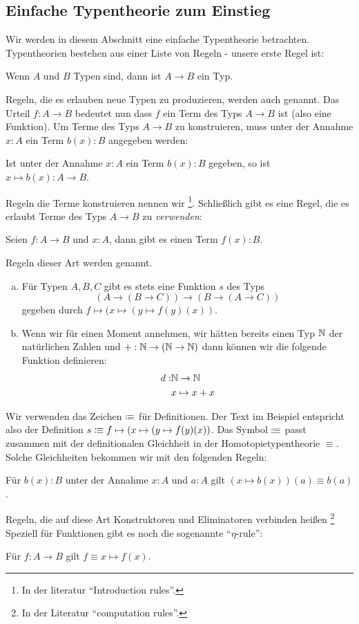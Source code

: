 \subsection{Einfache Typentheorie zum Einstieg}
Wir werden in diesem Abschnitt eine einfache Typentheorie betrachten.
Typentheorien bestehen aus einer Liste von Regeln - unsere erste Regel ist:
\begin{center}
 Wenn $A$ und $B$ Typen sind, dann ist $A\to B$ ein Typ.
\end{center}
Regeln, die es erlauben neue Typen zu produzieren, werden auch  genannt.
Das Urteil $f:A\to B$ bedeutet nun dass $f$ ein Term des Typs $A\to B$ ist (also eine Funktion).
Um Terme des Typs $A\to B$ zu konstruieren, muss unter der Annahme $x:A$ ein Term $b(x):B$ angegeben werden:
\begin{center}
  Ist unter der Annahme $x:A$ ein Term $b(x):B$ gegeben, so ist $x\mapsto b(x) : A\to B$.
\end{center}
Regeln die Terme konstruieren nennen wir \footnote{In der literatur ``Introduction rules''.}.
Schließlich gibt es eine Regel, die es erlaubt Terme des Typs $A\to B$ zu \emph{verwenden}:
\begin{center}
  Seien $f:A\to B$ und $x:A$, dann gibt es einen Term $f(x):B$.
\end{center}
Regeln dieser Art werden  genannt.
\begin{beispiel}
\begin{enumerate}[(a)]
\item Für Typen $A,B,C$ gibt es stets eine Funktion $s$ des Typs
  \[
    (A\to (B\to C)) \to (B\to (A\to C))
  \]
  gegeben durch $f\mapsto (x\mapsto (y \mapsto f(y)(x))$.
\item Wenn wir für einen Moment annehmen, wir hätten bereits einen Typ $\mathbb{N}$ der natürlichen Zahlen und $+:\mathbb{N}\to(\mathbb{N}\to \mathbb{N})$ dann können wir die folgende Funktion definieren:
\begin{align*}
  d:&\mathbb{N}\to\mathbb{N} \\
    & x\mapsto x+x
\end{align*}
\end{enumerate}
\end{beispiel}
Wir verwenden das Zeichen $\vcentcolon\mspace{-1.2mu}\equiv$ für Definitionen.
Der Text im Beispiel entspricht also der Definition $s\vcentcolon\mspace{-1.2mu}\equiv f\mapsto (x\mapsto (y \mapsto f(y)(x))$.
Das Symbol $\vcentcolon\mspace{-1.2mu}\equiv$ passt zusammen mit der definitionalen Gleichheit in der Homotopietypentheorie $\equiv$. Solche Gleichheiten bekommen wir mit den folgenden Regeln:
\begin{center}
  Für $b(x):B$ unter der Annahme $x:A$ und $a:A$ gilt $(x\mapsto b(x))(a)\equiv b(a)$.
\end{center}
Regeln, die auf diese Art Konstruktoren und Eliminatoren verbinden heißen \footnote{In der Literatur ``computation rules''.}
Speziell für Funktionen gibt es noch die sogenannte ``$\eta$-rule'':
\begin{center}
  Für $f:A\to B$ gilt $f\equiv x\mapsto f(x)$.
\end{center}

